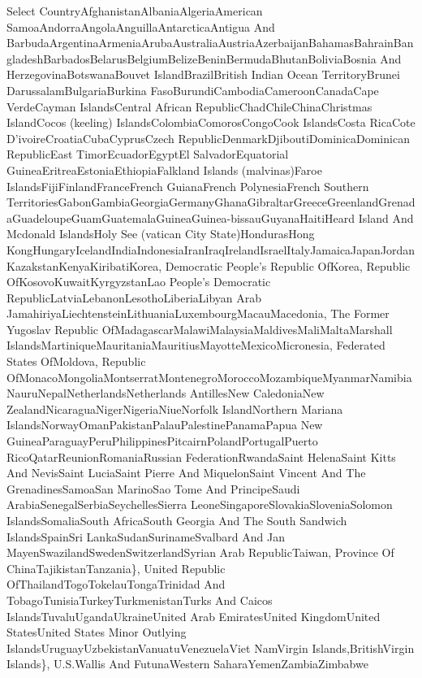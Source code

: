 Select CountryAfghanistanAlbaniaAlgeriaAmerican
SamoaAndorraAngolaAnguillaAntarcticaAntigua And
BarbudaArgentinaArmeniaArubaAustraliaAustriaAzerbaijanBahamasBahrainBangladeshBarbadosBelarusBelgiumBelizeBeninBermudaBhutanBoliviaBosnia
And HerzegovinaBotswanaBouvet IslandBrazilBritish Indian Ocean
TerritoryBrunei DarussalamBulgariaBurkina
FasoBurundiCambodiaCameroonCanadaCape VerdeCayman IslandsCentral African
RepublicChadChileChinaChristmas IslandCocos (keeling)
IslandsColombiaComorosCongoCook IslandsCosta RicaCote
D'ivoireCroatiaCubaCyprusCzech RepublicDenmarkDjiboutiDominicaDominican
RepublicEast TimorEcuadorEgyptEl SalvadorEquatorial
GuineaEritreaEstoniaEthiopiaFalkland Islands (malvinas)Faroe
IslandsFijiFinlandFranceFrench GuianaFrench PolynesiaFrench Southern
TerritoriesGabonGambiaGeorgiaGermanyGhanaGibraltarGreeceGreenlandGrenadaGuadeloupeGuamGuatemalaGuineaGuinea-bissauGuyanaHaitiHeard
Island And Mcdonald IslandsHoly See (vatican City State)HondurasHong
KongHungaryIcelandIndiaIndonesiaIranIraqIrelandIsraelItalyJamaicaJapanJordanKazakstanKenyaKiribatiKorea,
Democratic People's Republic OfKorea, Republic
OfKosovoKuwaitKyrgyzstanLao People's Democratic
RepublicLatviaLebanonLesothoLiberiaLibyan Arab
JamahiriyaLiechtensteinLithuaniaLuxembourgMacauMacedonia, The Former
Yugoslav Republic OfMadagascarMalawiMalaysiaMaldivesMaliMaltaMarshall
IslandsMartiniqueMauritaniaMauritiusMayotteMexicoMicronesia, Federated
States OfMoldova, Republic
OfMonacoMongoliaMontserratMontenegroMoroccoMozambiqueMyanmarNamibiaNauruNepalNetherlandsNetherlands
AntillesNew CaledoniaNew ZealandNicaraguaNigerNigeriaNiueNorfolk
IslandNorthern Mariana
IslandsNorwayOmanPakistanPalauPalestinePanamaPapua New
GuineaParaguayPeruPhilippinesPitcairnPolandPortugalPuerto
RicoQatarReunionRomaniaRussian FederationRwandaSaint HelenaSaint Kitts
And NevisSaint LuciaSaint Pierre And MiquelonSaint Vincent And The
GrenadinesSamoaSan MarinoSao Tome And PrincipeSaudi
ArabiaSenegalSerbiaSeychellesSierra
LeoneSingaporeSlovakiaSloveniaSolomon IslandsSomaliaSouth AfricaSouth
Georgia And The South Sandwich IslandsSpainSri
LankaSudanSurinameSvalbard And Jan MayenSwazilandSwedenSwitzerlandSyrian
Arab RepublicTaiwan, Province Of ChinaTajikistanTanzania\}, United
Republic OfThailandTogoTokelauTongaTrinidad And
TobagoTunisiaTurkeyTurkmenistanTurks And Caicos
IslandsTuvaluUgandaUkraineUnited Arab EmiratesUnited KingdomUnited
StatesUnited States Minor Outlying
IslandsUruguayUzbekistanVanuatuVenezuelaViet NamVirgin
Islands,BritishVirgin Islands\}, U.S.Wallis And FutunaWestern
SaharaYemenZambiaZimbabwe

